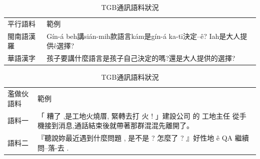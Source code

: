 \begin{table}
\caption{TGB通訊語料狀況}
\label{表：TGB通訊閩南語、華語對照}
\centering
\begin{tabular}{lp{30em}}
平行語料 & 範例 \\
閩南語漢羅 & Gín-á beh講sián-mih款語言kám是gín-á ka-tī決定--ê? Iah是大人提供ê選擇? \\
華語漢字 & 孩子要講什麼語言是孩子自己決定的嗎?還是大人提供的選擇? \\
\hline
\end{tabular}
\begin{tabular}{lp{30em}}
濫做伙語料 & 範例 \\
語料一 & 「 糟了 ,是工地火燒厝, 緊轉去打 火 ! 」建設公司 的 工地主任 從手機接到消息,通話結束後就帶著那群混混先離開了。 \\
語料二 & 『聽說妳最近遇到什麼問題 , 是不是 ? 怎麼了 ? 』好性地 ê QA 繼續問--落-去 . \\
\end{tabular}
\end{table}

%
%
%
%


